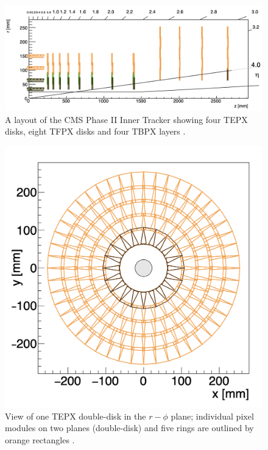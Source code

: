\begin{figure}[H]
  \centering
  \includegraphics[width=1 \columnwidth]{ashish_thesis/it_newgeometry_.png}
  \caption[Phase II CMS Inner Tracker]{ \onehalfspacing A layout of the CMS Phase II Inner Tracker showing four TEPX disks, eight TFPX disks and four TBPX layers \cite{Collaboration:275907420}.}
  \label{fig:Innertracker}
\end{figure}

\begin{figure}[H]
  \centering
  \includegraphics[width=0.5 \columnwidth]{ashish_thesis/tepx_DD.png}
  \caption[X-Y view of TEPX double-disk]{ \onehalfspacing View of one TEPX double-disk in the $r-\phi$ plane; individual pixel modules on two planes (double-disk) and five rings are outlined by orange rectangles \cite{Collaboration:275907420}. %
  }
  \label{fig:Innertracker_40}
\end{figure}


